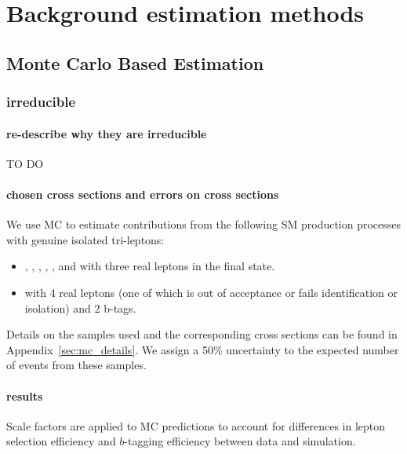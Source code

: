 \chapter{Background estimation methods}
	\section{Monte Carlo Based Estimation}
	\label{sec:irreducible_estimation}
	\subsection{irreducible}
        		\subsubsection{re-describe why they are irreducible}
		TO DO
		
        		\subsubsection{chosen cross sections and errors on cross sections}
		We use MC to estimate contributions from the following SM production processes with genuine isolated tri-leptons:

\begin{itemize}
\item \WZZ, \ttWW, \ttW, \tbZ, \ttG, and \ttH with three real leptons in the final state.
\item \ZZZ with 4 real leptons (one of which is out of acceptance or fails identification or isolation) and 2 b-tags.
\end{itemize}




Details on the samples used and the corresponding cross sections can be found in Appendix~\ref{sec:mc_details}.  
We assign a 50\% uncertainty to the expected number of events from these samples.
		
		\subsubsection{results}
		
Scale factors are applied to MC predictions to account for differences in lepton selection efficiency and $b$-tagging efficiency between data and simulation.


